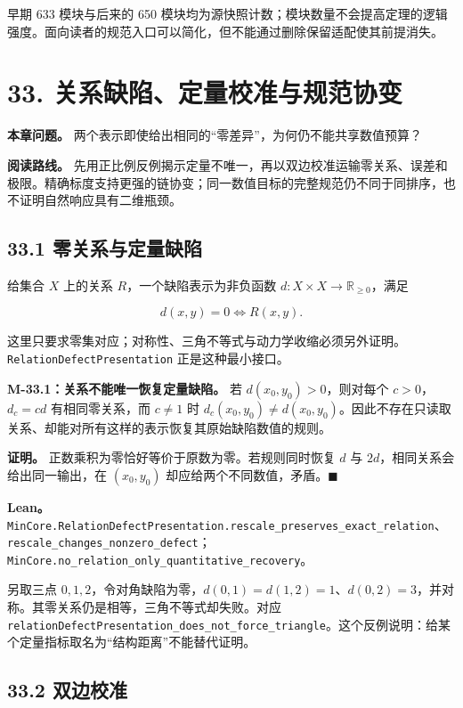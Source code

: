 \documentclass[
  11pt,
  oneside]{book}
\begin{document}
早期 633 模块与后来的 650 模块均为源快照计数；模块数量不会提高定理的逻辑强度。面向读者的规范入口可以简化，但不能通过删除保留适配使其前提消失。

\chapter{33. 关系缺陷、定量校准与规范协变}\label{ch-33}

\textbf{本章问题。} 两个表示即使给出相同的``零差异''，为何仍不能共享数值预算？

\textbf{阅读路线。} 先用正比例反例揭示定量不唯一，再以双边校准运输零关系、误差和极限。精确标度支持更强的链协变；同一数值目标的完整规范仍不同于同排序，也不证明自然响应具有二维瓶颈。

\section{33.1 零关系与定量缺陷}\label{ux96f6ux5173ux7cfbux4e0eux5b9aux91cfux7f3aux9677}

给集合 \(X\) 上的关系 \(R\)，一个缺陷表示为非负函数 \(d:X\times X\to\mathbb R_{\ge0}\)，满足

\[d(x,y)=0\iff R(x,y).\]

这里只要求零集对应；对称性、三角不等式与动力学收缩必须另外证明。\nolinkurl{RelationDefectPresentation} 正是这种最小接口。

\hypertarget{m-33-1}{}\label{m-33-1}

\textbf{M-33.1：关系不能唯一恢复定量缺陷。} 若 \(d(x_0,y_0)>0\)，则对每个 \(c>0\)，\(d_c=cd\) 有相同零关系，而 \(c\ne1\) 时 \(d_c(x_0,y_0)\ne d(x_0,y_0)\)。因此不存在只读取关系、却能对所有这样的表示恢复其原始缺陷数值的规则。

\textbf{证明。} 正数乘积为零恰好等价于原数为零。若规则同时恢复 \(d\) 与 \(2d\)，相同关系会给出同一输出，在 \((x_0,y_0)\) 却应给两个不同数值，矛盾。\(\blacksquare\)

\textbf{Lean。} \nolinkurl{MinCore.RelationDefectPresentation.rescale_preserves_exact_relation}、\nolinkurl{rescale_changes_nonzero_defect}；\nolinkurl{MinCore.no_relation_only_quantitative_recovery}。

另取三点 \(0,1,2\)，令对角缺陷为零，\(d(0,1)=d(1,2)=1\)、\(d(0,2)=3\)，并对称。其零关系仍是相等，三角不等式却失败。对应 \nolinkurl{relationDefectPresentation_does_not_force_triangle}。这个反例说明：给某个定量指标取名为``结构距离''不能替代证明。

\section{33.2 双边校准}\label{ux53ccux8fb9ux6821ux51c6}
\end{document}
